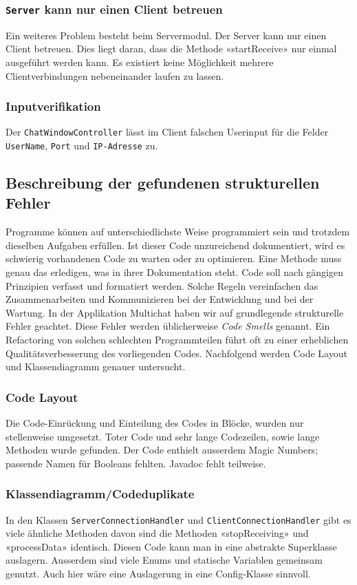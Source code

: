 \documentclass[10pt, hyperref, a4paper]{article}
\begin{document}
\subsubsection{\texttt{Server} kann nur einen Client betreuen}
Ein weiteres Problem besteht beim Servermodul. Der Server kann nur einen Client betreuen. Dies liegt daran, dass die Methode «startReceive» nur einmal ausgeführt werden kann. Es existiert keine Möglichkeit mehrere Clientverbindungen nebeneinander laufen zu lassen.

\subsubsection{Inputverifikation}
Der \texttt{ChatWindowController} lässt im Client falschen Userinput für die Felder \texttt{UserName}, \texttt{Port} und \texttt{IP-Adresse} zu. 




\subsection{Beschreibung der gefundenen strukturellen Fehler}\label{struk}
Programme können auf unterschiedlichste Weise programmiert sein und trotzdem dieselben Aufgaben erfüllen. Ist dieser Code unzureichend dokumentiert, wird es schwierig vorhandenen Code zu warten oder zu optimieren. Eine Methode muss genau das erledigen, was in ihrer Dokumentation steht. Code soll nach gängigen Prinzipien verfasst und formatiert werden. Solche Regeln vereinfachen das Zusammenarbeiten und Kommunizieren bei der Entwicklung und bei der Wartung. In der Applikation Multichat haben wir auf grundlegende strukturelle Fehler geachtet. Diese Fehler werden üblicherweise \emph{Code Smells} genannt.\cite{Fowler1999} Ein Refactoring von solchen schlechten Programmteilen führt oft zu einer erheblichen Qualitätsverbesserung des vorliegenden Codes. Nachfolgend werden Code Layout und Klassendiagramm genauer untersucht.

\subsubsection{Code Layout} \label{smells}
Die Code-Einrückung und Einteilung des Codes in Blöcke, wurden nur stellenweise umgesetzt. Toter Code und sehr lange Codezeilen, sowie lange Methoden wurde gefunden. Der Code enthielt ausserdem Magic Numbers; passende Namen für Booleans fehlten. Javadoc fehlt teilweise.

\subsubsection{Klassendiagramm/Codeduplikate}
In den Klassen \texttt{ServerConnectionHandler} und \texttt{ClientConnectionHandler} gibt es viele ähnliche Methoden davon sind die Methoden «stopReceiving» und «processData» identisch. Diesen Code kann man in eine abstrakte Superklasse auslagern. Ausserdem sind viele Enums und statische Variablen gemeinsam genutzt. Auch hier wäre eine Auslagerung in eine Config-Klasse sinnvoll.
\end{document}
